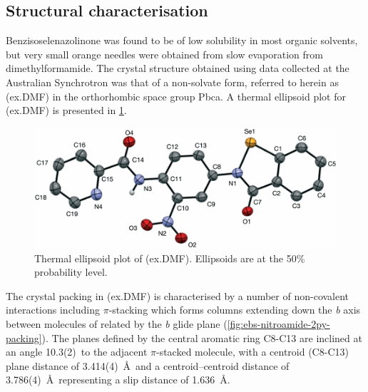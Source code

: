 \begin{refsection}
    \subsection{Structural characterisation}
    Benzisoselenazolinone  was found to be of low solubility in most organic solvents, but very small orange needles were obtained from slow evaporation from dimethylformamide.
    The crystal structure obtained using data collected at the Australian Synchrotron was that of a non-solvate form, referred to herein as (ex.DMF) in the orthorhombic space group Pbca.
    A thermal ellipsoid plot for (ex.DMF) is presented in \cref{fig:ebs-nitroamide-2py-dmf-xtal}.
    
    \begin{figure}
        \centering
        \includegraphics[width=0.8\linewidth]{Figures/ebs-nitroamide-2py-dmf-xtal.pdf}
        \caption[Thermal ellipsoid plot of (ex.DMF).]{Thermal ellipsoid plot of (ex.DMF). Ellipsoids are at the 50\% probability level.}\label{fig:ebs-nitroamide-2py-dmf-xtal}
    \end{figure}
    
    The crystal packing in (ex.DMF) is characterised by a number of non-covalent interactions including $\pi$-stacking which forms columns extending down the \emph{b} axis between molecules of  related by the \emph{b} glide plane (\cref{fig:ebs-nitroamide-2py-packing}).
    The planes defined by the central aromatic ring C8-C13 are inclined at an angle 10.3(2)\degree~to the adjacent $\pi$-stacked molecule, with a centroid (C8-C13) plane distance of 3.414(4)~\AA~and a centroid–centroid distance of 3.786(4)~\AA~representing a slip distance of 1.636~\AA.\@
    

\end{refsection}
